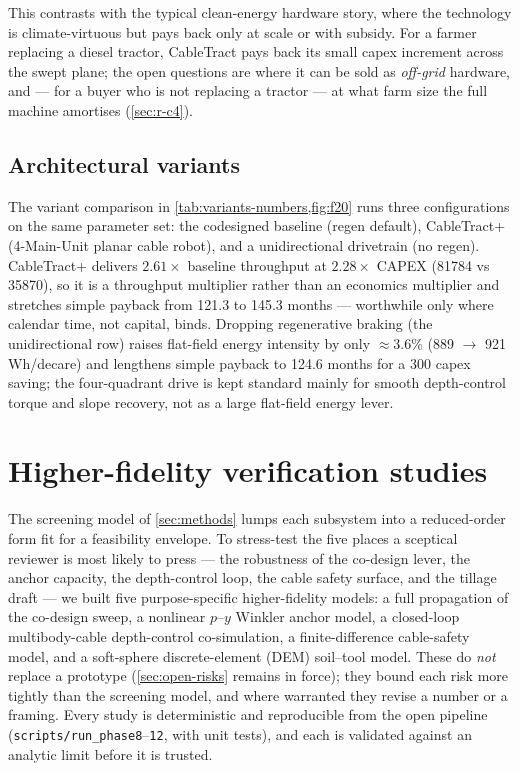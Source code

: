 \documentclass[11pt,a4paper]{article}
\begin{document}
This contrasts with the typical clean-energy hardware story, where the technology is climate-virtuous but pays back only at scale or with subsidy. For a farmer replacing a diesel tractor, CableTract pays back its small capex increment across the swept plane; the open questions are where it can be sold as \emph{off-grid} hardware, and --- for a buyer who is not replacing a tractor --- at what farm size the full machine amortises (\cref{sec:r-c4}).

\subsection{Architectural variants}\label{sec:r-pareto}

The variant comparison in \cref{tab:variants-numbers,fig:f20} runs three configurations on the same parameter set: the codesigned baseline (regen default), CableTract+ (4-Main-Unit planar cable robot), and a unidirectional drivetrain (no regen). CableTract+ delivers $2.61\times$ baseline throughput at $2.28\times$ CAPEX (\SI{81784}{\EUR} vs \SI{35870}{\EUR}), so it is a throughput multiplier rather than an economics multiplier and stretches simple payback from 121.3 to 145.3 months --- worthwhile only where calendar time, not capital, binds. Dropping regenerative braking (the unidirectional row) raises flat-field energy intensity by only ${\approx}3.6\%$ (889 $\to$ 921 Wh/decare) and lengthens simple payback to 124.6 months for a \SI{300}{\EUR} capex saving; the four-quadrant drive is kept standard mainly for smooth depth-control torque and slope recovery, not as a large flat-field energy lever.

\section{Higher-fidelity verification studies}\label{sec:verification}

The screening model of \cref{sec:methods} lumps each subsystem into a reduced-order form fit for a feasibility envelope. To stress-test the five places a sceptical reviewer is most likely to press --- the robustness of the co-design lever, the anchor capacity, the depth-control loop, the cable safety surface, and the tillage draft --- we built five purpose-specific higher-fidelity models: a full propagation of the co-design sweep, a nonlinear $p$--$y$ Winkler anchor model, a closed-loop multibody-cable depth-control co-simulation, a finite-difference cable-safety model, and a soft-sphere discrete-element (DEM) soil--tool model. These do \emph{not} replace a prototype (\cref{sec:open-risks} remains in force); they bound each risk more tightly than the screening model, and where warranted they revise a number or a framing. Every study is deterministic and reproducible from the open pipeline (\texttt{scripts/run\_phase8}--\texttt{12}, with unit tests), and each is validated against an analytic limit before it is trusted.
\end{document}
